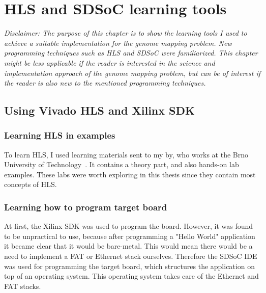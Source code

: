 
\chapter{HLS and SDSoC learning tools}
\label{ch:InitDiff}

\textit{Disclaimer: The purpose of this chapter is to show the learning tools I used to achieve a suitable implementation for the genome mapping problem. New programming techniques such as HLS and SDSoC were familiarized. This chapter might be less applicable if the reader is interested in the science and implementation approach of the genome mapping problem, but can be of interest if the reader is also new to the mentioned programming techniques.}

\section{Using Vivado HLS and Xilinx SDK}

\subsection{Learning HLS in examples}
\label{HLS}

To learn HLS, I used learning materials sent to my by, who works at the Brno University of Technology~\cite{martinek}. It contains a theory part,  and also hands-on lab examples. These labs were worth exploring in this thesis since they contain most concepts of HLS.

\subsection{Learning how to program target board}

At first, the Xilinx SDK was used to program the board. However, it was found to be unpractical to use, because after programming a "Hello World" application it became clear that it would be bare-metal. This would mean there would be a need to implement a FAT or Ethernet stack ourselves.
Therefore the SDSoC IDE was used for programming the target board, which structures the application on top of an operating system. This operating system takes care of the Ethernet and FAT stacks.

